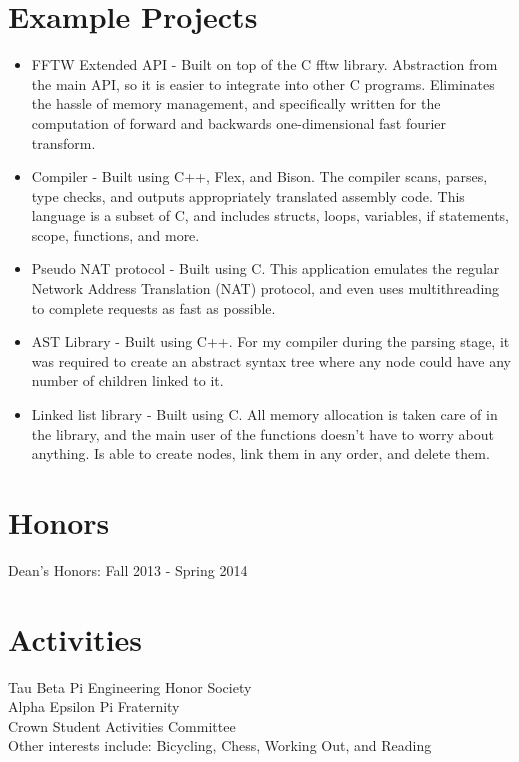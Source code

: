 \documentclass{res}
\begin{document}
{\begin{resume}
\section{\bf  Example Projects}
\begin{itemize}
  \item FFTW Extended API - Built on top of the C fftw library. Abstraction from the main API, so it is easier to integrate into other C programs. Eliminates the hassle of memory management, and specifically written for the computation of forward and backwards one-dimensional fast fourier transform.
  \item Compiler - Built using C++, Flex, and Bison. The compiler scans, parses, type checks, and outputs appropriately translated assembly code. This language is a subset of C, and includes structs, loops, variables, if statements, scope, functions, and more.
	\item Pseudo NAT protocol - Built using C. This application emulates the regular Network Address Translation (NAT) protocol, and even uses multithreading to complete requests as fast as possible.
  \item AST Library - Built using C++. For my compiler during the parsing stage, it was required to create an abstract syntax tree where any node could have any number of children linked to it.
	\item Linked list library - Built using C. All memory allocation is taken care of in the library, and the main user of the functions doesn’t have to worry about anything. Is able to create nodes, link them in any order, and delete them.
\end{itemize}

\section{\bf  Honors}
Dean's Honors: Fall 2013 - Spring 2014
 
\section{\bf  Activities}
Tau Beta Pi Engineering Honor Society \\
Alpha Epsilon Pi Fraternity \\
Crown Student Activities Committee \\
Other interests include: Bicycling, Chess, Working Out, and Reading

\end{resume}

\vfill} %
\end{document}
